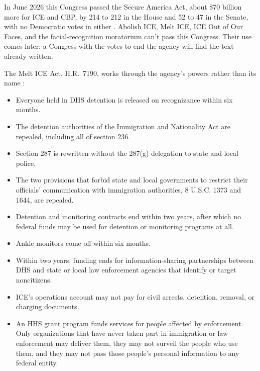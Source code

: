 In June 2026 this Congress passed the Secure America Act, about \$70 billion more for ICE and CBP, by 214 to 212 in the House and 52 to 47 in the Senate, with no Democratic votes in either \autocite{GT2026SecureAmerica}. Abolish ICE, Melt ICE, ICE Out of Our Faces, and the facial-recognition moratorium can't pass this Congress. Their use comes later: a Congress with the votes to end the agency will find the text already written.


The Melt ICE Act, H.R.~7190, works through the agency's powers rather than its name \autocite{hr7190}:

\begin{itemize}
\item Everyone held in DHS detention is released on recognizance within six months.
\item The detention authorities of the Immigration and Nationality Act are repealed, including all of section 236.
\item Section 287 is rewritten without the 287(g) delegation to state and local police.
\item The two provisions that forbid state and local governments to restrict their officials' communication with immigration authorities, 8 U.S.C. 1373 and 1644, are repealed.
\item Detention and monitoring contracts end within two years, after which no federal funds may be used for detention or monitoring programs at all.
\item Ankle monitors come off within six months.
\item Within two years, funding ends for information-sharing partnerships between DHS and state or local law enforcement agencies that identify or target noncitizens.
\item ICE's operations account may not pay for civil arrests, detention, removal, or charging documents.
\item An HHS grant program funds services for people affected by enforcement. Only organizations that have never taken part in immigration or law enforcement may deliver them, they may not surveil the people who use them, and they may not pass those people's personal information to any federal entity.
\end{itemize}


